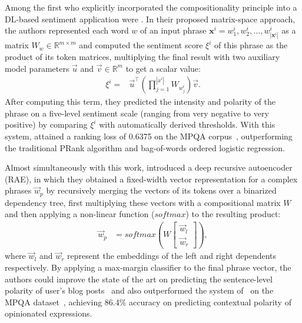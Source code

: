 Among the first who explicitly incorporated the compositionality
principle into a DL-based sentiment application were
\citet{Yessenalina:11}.  In their proposed matrix-space approach, the
authors represented each word $w$ of an input phrase $\mathbf{x}^i =
w^i_1, w^i_2, \ldots, w^i_{|\mathbf{x}^i|}$ as a matrix
$W_{w}\in\mathbb{R}^{m\times m}$ and computed the sentiment score
$\xi^i$ of this phrase as the product of its token matrices,
multiplying the final result with two auxiliary model parameters
$\vec{u}$ and $\vec{v}\in\mathbb{R}^m$ to get a scalar value:
\begin{align*}
  \xi^i =& \vec{u}^\top\left(\prod_{j=1}^{|x^i|}W_{w^i_j}\right)\vec{v}.
\end{align*}
After computing this term, they predicted the intensity and polarity
of the phrase on a five-level sentiment scale (ranging from very
negative to very positive) by comparing $\xi^i$ with automatically
derived thresholds.  With this system, \citeauthor{Yessenalina:11}
attained a ranking loss of 0.6375 on the MPQA corpus~\cite{Wiebe:05},
outperforming the traditional PRank algorithm \cite{Crammer:01} and
bag-of-words ordered logistic regression.

Almost simultaneously with this work, \citet{Socher:11} introduced a
deep recursive autoencoder (RAE), in which they obtained a fixed-width
vector representation for a complex phrases $\vec{w}_p$ by recursively
merging the vectors of its tokens over a binarized dependency tree,
first multiplying these vectors with a compositional matrix $W$ and
then applying a non-linear function ($softmax$) to the resulting
product:
\begin{align}
  \vec{w}_p &= softmax\left(W\begin{bmatrix}
      \vec{w}_l\\
      \vec{w}_r
  \end{bmatrix}\right),\label{cgsa:eq:socher-11}
\end{align}
where $\vec{w}_l$ and $\vec{w}_r$ represent the embeddings of the left
and right dependents respectively.  By applying a max-margin
classifier to the final phrase vector, the authors could improve the
state of the art on predicting the sentence-level polarity of user's
blog posts~\cite{Potts:10} and also outperformed the system
of~\citet{Nasukawa:03} on the MPQA dataset~\cite{Wiebe:05}, achieving
86.4\% accuracy on predicting contextual polarity of opinionated
expressions.

